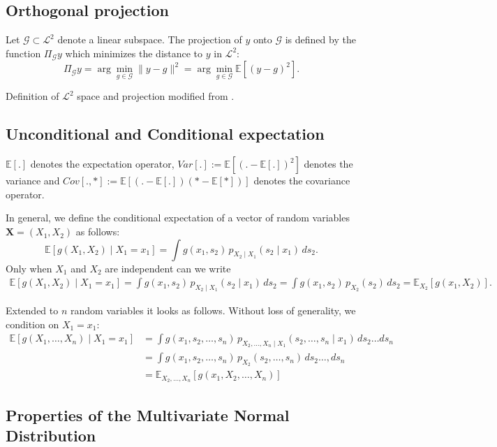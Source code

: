 \subsection*{Orthogonal projection}
Let $\mathcal{G} \subset \mathcal{L}^2$ denote a linear subspace. The projection of $y$ onto $\mathcal{G}$ is defined by the function $\Pi_{\mathcal{G}}y$ which minimizes the distance to $y$ in $\mathcal{L}^2$:
\[
\Pi_{\mathcal{G}}y = \arg\min_{g \in \mathcal{G}} \|y - g\|^2
= \arg\min_{g \in \mathcal{G}} \mathbb{E}[(y - g)^2].
\]

Definition of $\mathcal{L}^2$ space and projection modified from \cite{nagler2024linalg}.

\subsection*{Unconditional and Conditional expectation}
$\mathbb{E}[.]$ denotes the expectation operator, $Var[.] := \mathbb{E}[(. - \mathbb{E}[.])^2]$ denotes the variance and $Cov[.,*] := \mathbb{E}[(. - \mathbb{E}[.]) (* - \mathbb{E}[*])]$ denotes the covariance operator.\par
In general, we define the conditional expectation of a vector of random variables $\boldsymbol{X} = (X_1, X_2)$ as follows:
\[
\mathbb{E}[g(X_1, X_2) \mid X_1 = x_1] = \int g(x_1, s_2) \, p_{X_2 \mid X_1}(s_2 \mid x_1) \, ds_2.
\]
Only when $X_1$ and $X_2$ are independent can we write
\begin{align*}
    \mathbb{E}[g(X_1, X_2) \mid X_1 = x_1] = \int g(x_1, s_2) \, p_{X_2 \mid X_1}(s_2 \mid x_1) \, ds_2 = \int g(x_1, s_2) \, p_{X_2}(s_2) \, ds_2 = \mathbb{E}_{X_2}[g(x_1, X_2)].
\end{align*}

Extended to $n$ random variables it looks as follows. Without loss of generality, we condition on $X_1 = x_1$:
\begin{align*}
    \mathbb{E}[g(X_1, \dots, X_n) \mid X_1 = x_1] &= \int g(x_1, s_2, \dots, s_n) \, p_{X_2, \dots, X_n \mid X_1}(s_2, \dots, s_n \mid x_1) \, ds_2 \dots ds_n \\
    &= \int g(x_1, s_2, \dots, s_n) \, p_{X_2}(s_2, \dots, s_n) \, ds_2 \dots, ds_n \\
    &= \mathbb{E}_{X_2, \dots, X_n}[g(x_1, X_2, \dots, X_n)]
\end{align*}



\subsection*{Properties of the Multivariate Normal Distribution}

